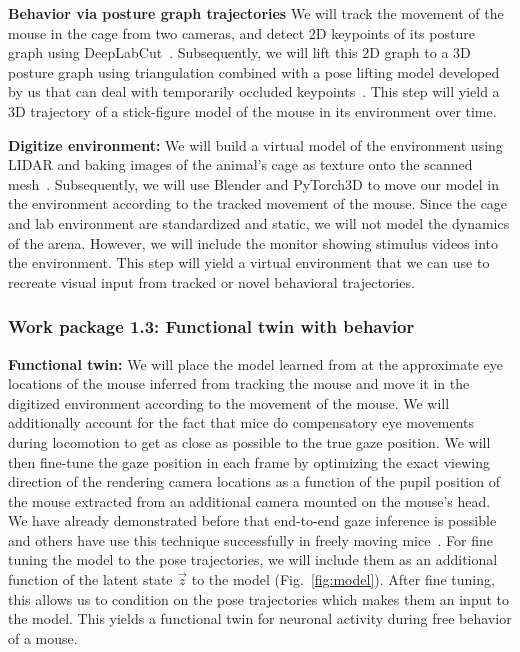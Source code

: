 \documentclass[B2,COG]{ercgrant}
\begin{document}
\textbf{Behavior via posture graph trajectories}
We will track the movement of the mouse in the cage from two cameras, and detect 2D keypoints of its posture graph using DeepLabCut~\parencite{Mathis2018-lk}. 
Subsequently, we will lift this 2D graph to a 3D posture graph using triangulation combined with a pose lifting model developed by us that can deal with temporarily occluded keypoints~\parencite{Pierzchlewicz2022-tq}. 
This step will yield a 3D trajectory of a stick-figure model of the mouse in its environment over time. 

\textbf{Digitize environment:} 
We will build a virtual model of the environment using LIDAR and baking images of the animal's cage as texture onto the scanned mesh~\parencite[similar as in][]{Holmgren2021-jv}.
Subsequently, we will use Blender and PyTorch3D to move our model in the environment according to the tracked movement of the mouse.
Since the cage and lab environment are standardized and static, we will not model the dynamics of the arena. 
However, we will include the monitor showing stimulus videos into the environment. 
This step will yield a virtual environment that we can use to recreate visual input from tracked or novel behavioral trajectories.


\subsubsection{Work package 1.3: Functional twin with behavior\hfill{}}

\textbf{Functional twin:} We will place the model learned from  at the approximate eye locations of the mouse inferred from tracking the mouse and move it in the digitized environment according to the movement of the mouse. 
We will additionally account for the fact that mice do compensatory eye movements during locomotion\parencite[similar to rats][]{Wallace2013-lf} to get as close as possible to the true gaze position. 
We will then fine-tune the gaze position in each frame by optimizing the exact viewing direction of the rendering camera locations as a function of the pupil position of the mouse extracted from an additional camera mounted on the mouse's head.
We have already demonstrated before that end-to-end gaze inference is possible~\parencite{Sinz2018-sk,Walker2019-yw} and others have use this technique successfully in freely moving mice~\parencite{Parker2022-ac}.
For fine tuning the model to the pose trajectories, we will include them as an additional function of the latent state $\vec{z}$ to the model (Fig.~\ref{fig:model}). 
After fine tuning, this allows us to condition on the pose trajectories which makes them an input to the model. 
This yields a functional twin for neuronal activity during free behavior of a mouse.
\end{document}

